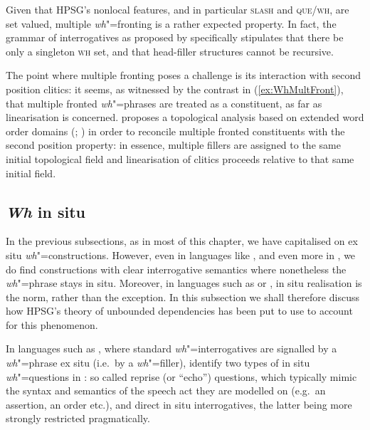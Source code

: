 \documentclass[output=paper
,notxmath 
 	        ,biblatex
                ,babelshorthands
                ,newtxmath
                ,draftmode
                ,colorlinks, citecolor=brown
]{langscibook}
\begin{document}
\noindent
Given that HPSG's nonlocal features, and in particular \textsc{slash}
and \textsc{que}/\textsc{wh}, are set valued, multiple \emph{wh}"=fronting is a
rather expected property. In fact, the grammar of 
interrogatives as proposed by \citet{Ginzburg:Sag:01} specifically
stipulates that there be only a singleton \textsc{wh} set, and that
head-filler structures cannot be recursive.

The point where  multiple fronting poses a challenge is its
interaction with second position clitics: it seems, as witnessed by
the contrast in (\ref{ex:WhMultFront}), that multiple fronted
\emph{wh}"=phrases are treated as a constituent, as far as
linearisation is concerned. \citet{Penn:99} proposes a topological
analysis based on extended word order domains
(\citealt{Reape:90,Reape94a,kathol_a00}{; }) in order to reconcile multiple fronted
constituents with the second position property: in essence, multiple
fillers are assigned to the same initial topological field and
linearisation of clitics proceeds relative to that same initial field.


\subsection{\emph{Wh} in situ}
\label{sec:UDC:WhInSitu}

In the previous subsections, as in most of this chapter, we have
capitalised on ex situ \emph{wh}"=constructions. However, even in
languages like , and even more in , we do find
constructions with clear interrogative semantics where nonetheless the
\emph{wh}"=phrase stays in situ. Moreover, in languages such as
 or  , in situ realisation is the norm, rather
than the exception. In this subsection we shall therefore discuss how
HPSG's theory of unbounded dependencies has been put to use to account
for this phenomenon.

In languages such as , where standard \emph{wh}"=interrogatives
are signalled by a \emph{wh}"=phrase ex situ (i.e.\ by a
\emph{wh}"=filler), \citet[Chapter~7]{Ginzburg:Sag:01} identify two types of in
situ \emph{wh}"=questions in : so called reprise (or ``echo'')
questions, which typically mimic the syntax and semantics of the
speech act they are modelled on (e.g.\ an assertion, an order etc.),
and direct in situ interrogatives, the latter being more strongly
restricted
pragmatically. %
\end{document}
